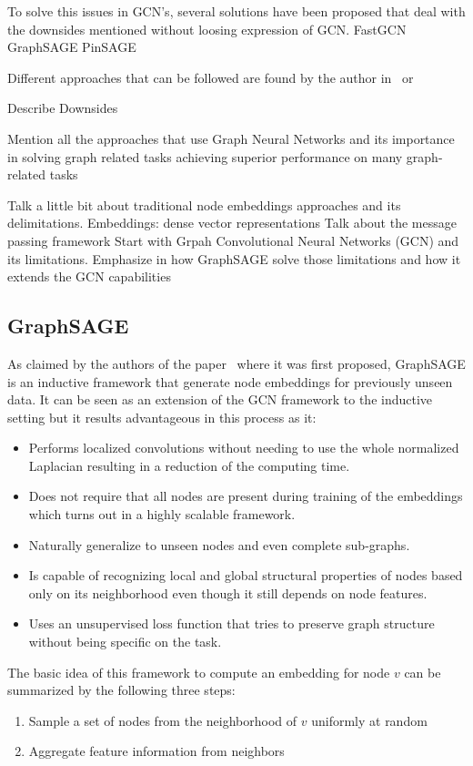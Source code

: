 To solve this issues in GCN's, several solutions have been proposed that deal with the downsides mentioned without loosing expression of GCN.
FastGCN
GraphSAGE 
PinSAGE

Different approaches that can be followed are found by the author in~\cite{gnnsurvey} or~\cite{hamilton}


Describe Downsides

Mention all the approaches that use Graph Neural Networks and its importance in solving graph related tasks
achieving superior performance on many graph-related tasks


Talk a little bit about traditional node embeddings approaches and its delimitations.
 Embeddings: dense vector representations
Talk about the message passing framework
Start with Grpah Convolutional Neural Networks (GCN) and its limitations. Emphasize in how GraphSAGE solve those limitations and how it extends the GCN capabilities

\subsection{GraphSAGE}
As claimed by the authors of the paper~\cite{graphsage} where it was first proposed, GraphSAGE is an inductive framework that generate node embeddings for previously unseen data. It can be seen as an extension of the GCN framework to the inductive setting but it results advantageous in this process as it:
\begin{itemize}
    \item Performs localized convolutions without needing to use the whole normalized Laplacian resulting in a reduction of the computing time.
    \item Does not require that all nodes are present during training of the embeddings which turns out in a highly scalable framework.
    \item Naturally generalize to unseen nodes and even complete sub-graphs.
    \item Is capable of recognizing local and global structural properties of nodes based only on its neighborhood even though it still depends on node features.
    \item Uses an unsupervised loss function that tries to preserve graph structure without being specific on the task.
\end{itemize}

The basic idea of this framework to compute an embedding for node $v$ can be summarized by the following three steps:
\begin{enumerate}
    \item Sample a set of nodes from the neighborhood of $v$ uniformly at random
    \item Aggregate feature information from neighbors
\end{enumerate}

